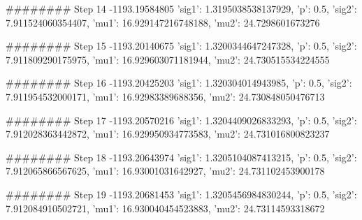 ########
Step 14
-1193.19584805
{'sig1': 1.3195038538137929, 'p': 0.5, 'sig2': 7.911524060354407, 'mu1': 16.929147216748188, 'mu2': 24.7298601673276}


########
Step 15
-1193.20140675
{'sig1': 1.3200344647247328, 'p': 0.5, 'sig2': 7.911809290175975, 'mu1': 16.929603071181944, 'mu2': 24.730515534224555}


########
Step 16
-1193.20425203
{'sig1': 1.320304014943985, 'p': 0.5, 'sig2': 7.911954532000171, 'mu1': 16.92983389688356, 'mu2': 24.730848050476713}


########
Step 17
-1193.20570216
{'sig1': 1.3204409026833293, 'p': 0.5, 'sig2': 7.912028363442872, 'mu1': 16.929950934773583, 'mu2': 24.731016800823237}


########
Step 18
-1193.20643974
{'sig1': 1.3205104087413215, 'p': 0.5, 'sig2': 7.912065866567625, 'mu1': 16.93001031642927, 'mu2': 24.731102453900178}


########
Step 19
-1193.20681453
{'sig1': 1.3205456984830244, 'p': 0.5, 'sig2': 7.912084910502721, 'mu1': 16.930040454523883, 'mu2': 24.73114593318672}


